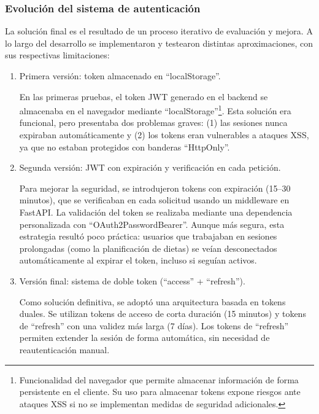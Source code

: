 \subsubsection{Evolución del sistema de autenticación}

La solución final es el resultado de un proceso iterativo de evaluación y mejora. A lo largo del desarrollo se implementaron y testearon distintas aproximaciones, con sus respectivas limitaciones:

\begin{enumerate}
    \item Primera versión: token almacenado en ``localStorage''.
    
    En las primeras pruebas, el token JWT generado en el backend se almacenaba en el navegador mediante ``localStorage''\footnote{Funcionalidad del navegador que permite almacenar información de forma persistente en el cliente. Su uso para almacenar tokens expone riesgos ante ataques XSS si no se implementan medidas de seguridad adicionales.}.  
    Esta solución era funcional, pero presentaba dos problemas graves: (1) las sesiones nunca expiraban automáticamente y (2) los tokens eran vulnerables a ataques XSS, ya que no estaban protegidos con banderas ``HttpOnly''.

    \item Segunda versión: JWT con expiración y verificación en cada petición.
    
    Para mejorar la seguridad, se introdujeron tokens con expiración (15–30 minutos), que se verificaban en cada solicitud usando un middleware en FastAPI. La validación del token se realizaba mediante una dependencia personalizada con ``OAuth2PasswordBearer''.  
    Aunque más segura, esta estrategia resultó poco práctica: usuarios que trabajaban en sesiones prolongadas (como la planificación de dietas) se veían desconectados automáticamente al expirar el token, incluso si seguían activos.

    \item Versión final: sistema de doble token (``access'' + ``refresh'').
    
    Como solución definitiva, se adoptó una arquitectura basada en tokens duales. Se utilizan tokens de acceso de corta duración (15 minutos) y tokens de ``refresh'' con una validez más larga (7 días). Los tokens de ``refresh'' permiten extender la sesión de forma automática, sin necesidad de reautenticación manual.


\end{enumerate}
